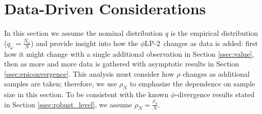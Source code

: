 \documentclass[opre,nonblindrev]{informs3} %
\renewcommand{\P}{\mathbb{P}}
\newcommand{\p}[1]{\P \left[ #1 \right]}
\newcommand{\plp}{$\phi$LP-2}
\begin{document}

\section{Data-Driven Considerations}
\label{sec:properties}

In this section we assume the nominal distribution $q$ is the empirical distribution ($q_\omega = \tfrac{N_\omega}{N}$) and provide insight into how the \plp\ changes as data is added: first how it might change with a single additional observation in Section \ref{ssec:value}, then as more and more data is gathered with asymptotic results in Section \ref{ssec:epiconvergence}.
This analysis must consider how $\rho$ changes as additional samples are taken; therefore, we use $\rho_N$ to emphasize the dependence on sample size in this section.
To be consistent with the known $\phi$-divergence results stated in Section \ref{ssec:robust_level}, we assume $\rho_N = \frac{\rho_0}{N}$.
\end{document}
